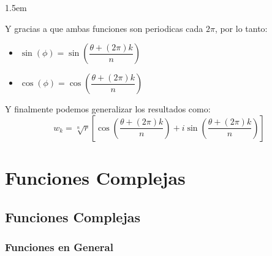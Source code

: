 \documentclass[12pt, fleqn]{report}                             %
\newenvironment{SmallIndentation}[1][0.75em]                    %
    {\begin{adjustwidth}{#1}{}\begin{footnotesize}}                 %
    {\end{footnotesize}\end{adjustwidth}}                           %
\newcommand{\Brackets}[1]{\left[ #1 \right]}                    %
\newcommand{\Wrap}[1]{\left( #1 \right)}                        %
\newcommand{\Cos}[1]{\cos\Wrap{#1}}                             %
\newcommand{\Sin}[1]{\sin\Wrap{#1}}                             %
\newcommand \Cis[1]  {\Cos{#1} + i \Sin{#1}}                    %
\newcommand \bCis[1] {\Brackets{\Cis{#1}}}                      %
\begin{document}
\begin{SmallIndentation}[1.5em]
\begin{itemize}
                                Y gracias a que ambas funciones son periodicas cada $2\pi$, por lo tanto:
                                \begin{itemize}
                                    \item $\Sin{\phi} = \Sin{\dfrac{\theta + (2\pi) k}{n}}$
                                    \item $\Cos{\phi} = \Cos{\dfrac{\theta + (2\pi) k}{n}}$
                                \end{itemize}

                        \end{itemize}


                        Y finalmente podemos generalizar los resultados como:
                        \begin{equation}
                            w_k = \sqrt[n]{r} \bCis{\dfrac{\theta + (2\pi) k}{n}}
                        \end{equation}


                    \end{SmallIndentation}





\part{Funciones Complejas}
\clearpage

    \chapter{Funciones Complejas}
        \clearpage

        \clearpage
        \section{Funciones en General}
\end{document}
